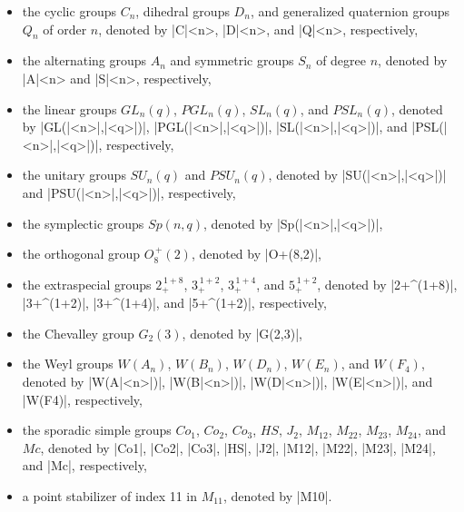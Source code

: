 \begin{itemize}
\item the  cyclic groups  $C_n$,  dihedral groups $D_n$,  and generalized
      quaternion groups  $Q_n$ of order $n$,  denoted by |C|<n>,  |D|<n>,
      and |Q|<n>, respectively, \vspace{-2mm}
\item the alternating groups  $A_n$  and symmetric groups $S_n$ of degree
      $n$,  denoted by  |A|<n> and  |S|<n>,  respectively,  \vspace{-2mm}
\item the linear groups $GL_n(q)$, $PGL_n(q)$, $SL_n(q)$, and $PSL_n(q)$,
      denoted       by       |GL(|<n>|,|<q>|)|,       |PGL(|<n>|,|<q>|)|,
      |SL(|<n>|,|<q>|)|, and |PSL(|<n>|,|<q>|)|, respectively,
      \vspace{-2mm}
\item the   unitary  groups   $SU_n(q)$   and   $PSU_n(q)$,   denoted  by
      |SU(|<n>|,|<q>|)|     and     |PSU(|<n>|,|<q>|)|,     respectively,
      \vspace{-2mm}
\item the  symplectic  groups  $Sp(n,q)$,  denoted by  |Sp(|<n>|,|<q>|)|,
      \vspace{-2mm}
\item the   orthogonal  group   $O_8^{\,+}(2)$,   denoted  by  |O+(8,2)|,
      \vspace{-2mm}
\item the    extraspecial    groups     $2_+^{\,1+8}$,     $3_+^{\,1+2}$,
      $3_+^{\,1+4}$,   and   $5_+^{\,1+2}$,    denoted   by   |2+^(1+8)|,
      |3+^(1+2)|, |3+^(1+4)|, and |5+^(1+2)|, respectively, \vspace{-2mm}
\item the Chevalley group $G_2(3)$, denoted by |G(2,3)|,
      \vspace{-2mm}
\item the  Weyl  groups   $W(A_n)$,  $W(B_n)$,  $W(D_n)$,  $W(E_n)$,  and
      $W(F_4)$,   denoted  by   |W(A|<n>|)|,   |W(B|<n>|)|,  |W(D|<n>|)|,
      |W(E|<n>|)|, and |W(F4)|, respectively, \vspace{-2mm}
\item the sporadic simple groups  $Co_1$,  $Co_2$,  $Co_3$,  $HS$, $J_2$,
      $M_{12}$,  $M_{22}$,  $M_{23}$,  $M_{24}$,  and  $Mc$,  denoted  by
      |Co1|, |Co2|, |Co3|,  |HS|, |J2|,  |M12|, |M22|, |M23|, |M24|,  and
      |Mc|, respectively, \vspace{-2mm}
\item a point  stabilizer  of index  11  in  $M_{11}$,  denoted by |M10|.
      \vspace{-2mm}
\end{itemize}

